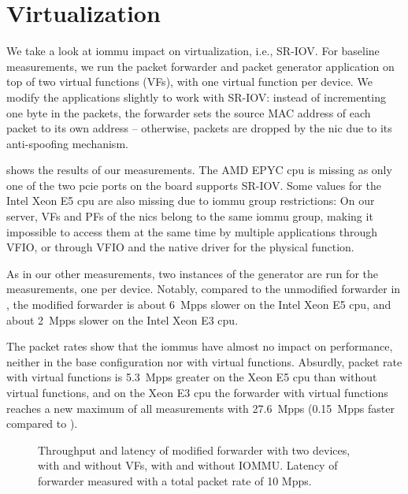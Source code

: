 \section{Virtualization}
\label{sec:virtualization}

We take a look at \ac{iommu} impact on virtualization, i.e., SR-IOV. For
baseline measurements, we run the packet forwarder and packet generator
application on top of two virtual functions (VFs), with one virtual function per
device. We modify the applications slightly to work with SR-IOV: instead of
incrementing one byte in the packets, the forwarder sets the source MAC address
of each packet to its own address -- otherwise, packets are dropped by the
\ac{nic} due to its anti-spoofing mechanism.

 shows the results of our measurements. The AMD EPYC
\ac{cpu} is missing as only one of the two \ac{pcie} ports on the board supports
SR-IOV. Some values for the Intel Xeon E5 \ac{cpu} are also missing due to
\ac{iommu} group restrictions: On our server, VFs and PFs of the \acp{nic}
belong to the same \ac{iommu} group, making it impossible to access them at the
same time by multiple applications through VFIO, or through VFIO and the native
driver for the physical function.

As in our other measurements, two instances of the generator are run for the
measurements, one per device. Notably, compared to the unmodified forwarder in
, the modified forwarder is about 6~Mpps
slower on the Intel Xeon E5 \ac{cpu}, and about 2~Mpps slower on the Intel Xeon
E3 \ac{cpu}.

The packet rates show that the \acp{iommu} have almost no impact on performance,
neither in the base configuration nor with virtual functions. Absurdly, packet
rate with virtual functions is 5.3~Mpps greater on the Xeon E5 \ac{cpu} than
without virtual functions, and on the Xeon E3 \ac{cpu} the forwarder with
virtual functions reaches a new maximum of all measurements with 27.6~Mpps
(0.15~Mpps faster compared to ).

\begin{figure}%
	\centering
    \par

    \caption{Throughput and latency of modified forwarder with two devices, with
    and without VFs, with and without IOMMU. Latency of forwarder measured with
    a total packet rate of 10 Mpps.}
	\label{fig:sriov-baseline}
\end{figure}


